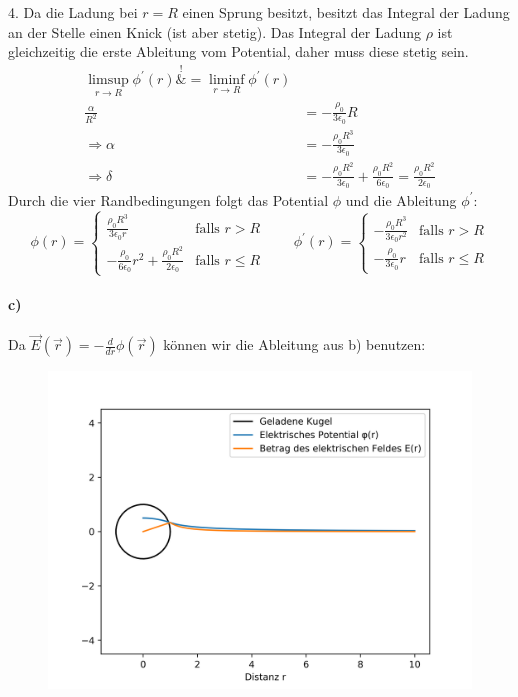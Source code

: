 \documentclass{article}
\newcommand{\epsz}{\epsilon_0}
\begin{document}
\par{4.}
Da die Ladung bei $r = R$ einen Sprung besitzt, besitzt das Integral der 
Ladung an der Stelle einen Knick (ist aber stetig). Das Integral der 
Ladung $\rho$ ist gleichzeitig die erste Ableitung vom Potential, daher
muss diese stetig sein. \\
\begin{align*}
	\limsup_{r\rightarrow R} \phi^\prime(r) \overset{!}&{=} 
	\liminf_{r\rightarrow R} \phi^\prime(r) \\
	\frac\alpha{R^2} 
	&= -\frac{\rho_0}{3\epsz} R\\
	\Rightarrow
	\alpha &=
	-\frac{\rho_0 R^3}{3\epsz} \\
	\Rightarrow
	\delta &= -\frac{\rho_0 R^2}{3\epsz} + 
	\frac{\rho_0 R^2}{6 \epsz} = \frac{\rho_0 R^2}{2\epsz}
\end{align*}
Durch die vier Randbedingungen folgt das Potential $\phi$ und die Ableitung
$\phi^\prime$:
\[
	\phi(r) =
	\begin{cases}
		\frac{\rho_0 R^3}{3\epsz r} & \text{falls } r > R \\
		-\frac{\rho_0}{6\epsz} r^2 + \frac{\rho_0 R^2}{2\epsz}
		& \text{falls } r \leq R
	\end{cases}
	\qquad
	\phi^\prime(r) =
	\begin{cases}
		-\frac{\rho_0 R^3}{3\epsz r^2}
		& \text{falls } r > R \\
		-\frac{\rho_0}{3\epsz} r
		& \text{falls } r \leq R
	\end{cases}
\]
\paragraph{c)}
Da $\vec E (\vec r) = -\frac{d}{dr} \phi(\vec r)$ können wir die Ableitung 
aus b) benutzen:
\begin{figure}[H]
	\centering
	\includegraphics[width = 15cm]{aufgabe2.png}
\end{figure}
\end{document}
